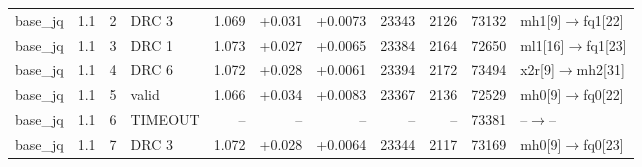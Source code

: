 \begin{tabular}{@{}llrlrrrrrrl@{}}
base\_jq & 1.1 & 2 & DRC 3 & 1.069 & +0.031 & +0.0073 & 23343 & 2126 & 73132 & mh1[9]$\to$fq1[22] \\
base\_jq & 1.1 & 3 & DRC 1 & 1.073 & +0.027 & +0.0065 & 23384 & 2164 & 72650 & ml1[16]$\to$fq1[23] \\
base\_jq & 1.1 & 4 & DRC 6 & 1.072 & +0.028 & +0.0061 & 23394 & 2172 & 73494 & x2r[9]$\to$mh2[31] \\
base\_jq & 1.1 & 5 & valid & 1.066 & +0.034 & +0.0083 & 23367 & 2136 & 72529 & mh0[9]$\to$fq0[22] \\
base\_jq & 1.1 & 6 & TIMEOUT & -- & -- & -- & -- & -- & 73381 & --$\to$-- \\
base\_jq & 1.1 & 7 & DRC 3 & 1.072 & +0.028 & +0.0064 & 23344 & 2117 & 73169 & mh0[9]$\to$fq0[23] \\
\bottomrule
\end{tabular}
